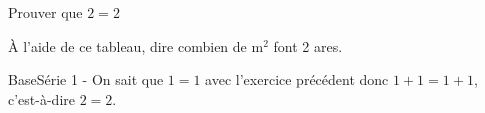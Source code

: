 \begin{exercice*}
    \partie
    Prouver que $2=2$

    \partie
    À l'aide de ce tableau, dire combien de $\text{m}^2$ font 2 ares.
\end{exercice*}
\begin{corrige}
    \setcounter{partie}{0} %
    \partie
    BaseSérie 1 - On sait que $1=1$ avec l’exercice précédent donc $1+1=1+1$,
    c’est-à-dire $2=2$.

    \partie
\end{corrige}
